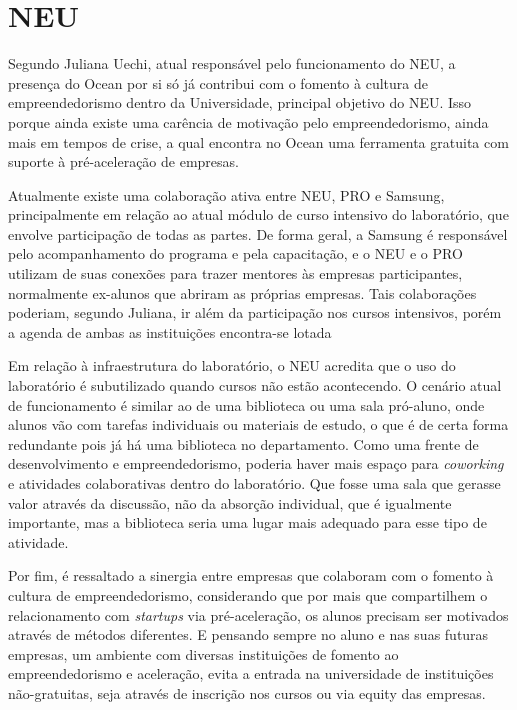 \section{NEU}

Segundo Juliana Uechi, atual responsável pelo funcionamento do NEU, a presença do Ocean por si só já contribui com o fomento à cultura de empreendedorismo dentro da Universidade, principal objetivo do NEU. Isso porque ainda existe uma carência de motivação pelo empreendedorismo, ainda mais em tempos de crise, a qual encontra no Ocean uma ferramenta gratuita com suporte à pré-aceleração de empresas. 

Atualmente existe uma colaboração ativa entre NEU, PRO e Samsung, principalmente em relação ao atual módulo de curso intensivo do laboratório, que envolve participação de todas as partes. De forma geral, a Samsung é responsável pelo acompanhamento do programa e pela capacitação, e o NEU e o PRO utilizam de suas conexões para trazer mentores às empresas participantes, normalmente ex-alunos que abriram as próprias empresas. Tais colaborações poderiam, segundo Juliana, ir além da participação nos cursos intensivos, porém a agenda de ambas as instituições encontra-se lotada

Em relação à infraestrutura do laboratório, o NEU acredita que o uso do laboratório é subutilizado quando cursos não estão acontecendo. O cenário atual de funcionamento é similar ao de uma biblioteca ou uma sala pró-aluno, onde alunos vão com tarefas individuais ou materiais de estudo, o que é de certa forma redundante pois já há uma biblioteca no departamento. Como uma frente de desenvolvimento e empreendedorismo, poderia haver mais espaço para \textit{coworking} e atividades colaborativas dentro do laboratório. Que fosse uma sala que gerasse valor através da discussão, não da absorção individual, que é igualmente importante, mas a biblioteca seria uma lugar mais adequado para esse tipo de atividade.

Por fim, é ressaltado a sinergia entre empresas que colaboram com o fomento à cultura de empreendedorismo, considerando que por mais que compartilhem o relacionamento com \textit{startups} via pré-aceleração, os alunos precisam ser motivados através de métodos diferentes. E pensando sempre no aluno e nas suas futuras empresas, um ambiente com diversas instituições de fomento ao empreendedorismo e aceleração, evita a entrada na universidade de instituições não-gratuitas, seja através de inscrição nos cursos ou via equity das empresas.


